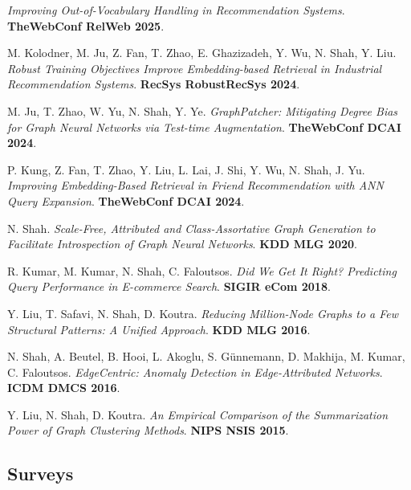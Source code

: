 \documentclass{article}
\begin{document}
\begin{etaremune}[itemsep=1pt,parsep=0pt]
\item \emph{Improving Out-of-Vocabulary Handling in Recommendation Systems}. \textbf{TheWebConf RelWeb 2025}.
\item M. Kolodner, M. Ju, Z. Fan, T. Zhao, E. Ghazizadeh, Y. Wu, N. Shah, Y. Liu. \emph{Robust Training Objectives Improve Embedding-based Retrieval in Industrial Recommendation Systems}. \textbf{RecSys RobustRecSys 2024}.
\item M. Ju, T. Zhao, W. Yu, N. Shah, Y. Ye. \emph{GraphPatcher: Mitigating Degree Bias for Graph Neural Networks via Test-time Augmentation}. \textbf{TheWebConf DCAI 2024}.
\item P. Kung, Z. Fan, T. Zhao, Y. Liu, L. Lai, J. Shi, Y. Wu, N. Shah, J. Yu. \emph{Improving Embedding-Based Retrieval in Friend Recommendation with ANN Query Expansion}. \textbf{TheWebConf DCAI 2024}.
\item N. Shah. \emph{Scale-Free, Attributed and Class-Assortative Graph Generation to Facilitate Introspection of Graph Neural Networks}. \textbf{KDD MLG 2020}.
\item R. Kumar, M. Kumar, N. Shah, C. Faloutsos. \emph{Did We Get It Right? Predicting Query Performance in E-commerce Search}. \textbf{SIGIR eCom 2018}.
\item Y. Liu, T. Safavi, N. Shah, D. Koutra. \emph{Reducing Million-Node Graphs to a Few Structural Patterns: A Unified Approach}. \textbf{KDD MLG 2016}.
\item N. Shah, A. Beutel, B. Hooi, L. Akoglu, S. Günnemann, D. Makhija, M. Kumar, C. Faloutsos. \emph{EdgeCentric: Anomaly Detection in Edge-Attributed Networks}. \textbf{ICDM DMCS 2016}.
\item Y. Liu, N. Shah, D. Koutra. \emph{An Empirical Comparison of the Summarization Power of Graph Clustering Methods}. \textbf{NIPS NSIS 2015}.
\end{etaremune}

\subsection*{\bf {Surveys}}
\end{document}
